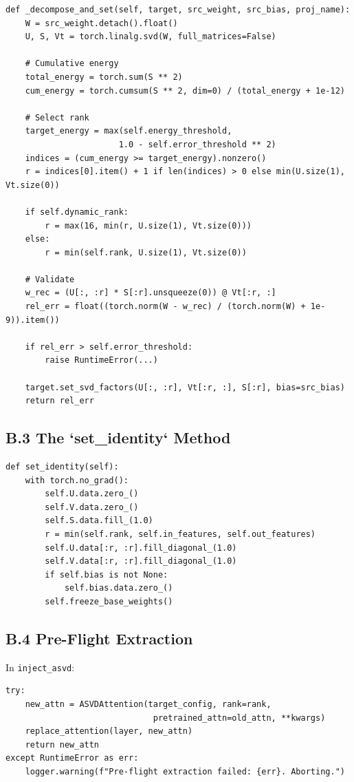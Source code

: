 \begin{lstlisting}
def _decompose_and_set(self, target, src_weight, src_bias, proj_name):
    W = src_weight.detach().float()
    U, S, Vt = torch.linalg.svd(W, full_matrices=False)
    
    # Cumulative energy
    total_energy = torch.sum(S ** 2)
    cum_energy = torch.cumsum(S ** 2, dim=0) / (total_energy + 1e-12)
    
    # Select rank
    target_energy = max(self.energy_threshold, 
                       1.0 - self.error_threshold ** 2)
    indices = (cum_energy >= target_energy).nonzero()
    r = indices[0].item() + 1 if len(indices) > 0 else min(U.size(1), Vt.size(0))
    
    if self.dynamic_rank:
        r = max(16, min(r, U.size(1), Vt.size(0)))
    else:
        r = min(self.rank, U.size(1), Vt.size(0))
    
    # Validate
    w_rec = (U[:, :r] * S[:r].unsqueeze(0)) @ Vt[:r, :]
    rel_err = float((torch.norm(W - w_rec) / (torch.norm(W) + 1e-9)).item())
    
    if rel_err > self.error_threshold:
        raise RuntimeError(...)
    
    target.set_svd_factors(U[:, :r], Vt[:r, :], S[:r], bias=src_bias)
    return rel_err
\end{lstlisting}

\subsection{B.3 The `set\_identity` Method}

\begin{lstlisting}
def set_identity(self):
    with torch.no_grad():
        self.U.data.zero_()
        self.V.data.zero_()
        self.S.data.fill_(1.0)
        r = min(self.rank, self.in_features, self.out_features)
        self.U.data[:r, :r].fill_diagonal_(1.0)
        self.V.data[:r, :r].fill_diagonal_(1.0)
        if self.bias is not None:
            self.bias.data.zero_()
        self.freeze_base_weights()
\end{lstlisting}

\subsection{B.4 Pre-Flight Extraction}

In \texttt{inject\_asvd}:

\begin{lstlisting}
try:
    new_attn = ASVDAttention(target_config, rank=rank,
                              pretrained_attn=old_attn, **kwargs)
    replace_attention(layer, new_attn)
    return new_attn
except RuntimeError as err:
    logger.warning(f"Pre-flight extraction failed: {err}. Aborting.")
\end{lstlisting}

